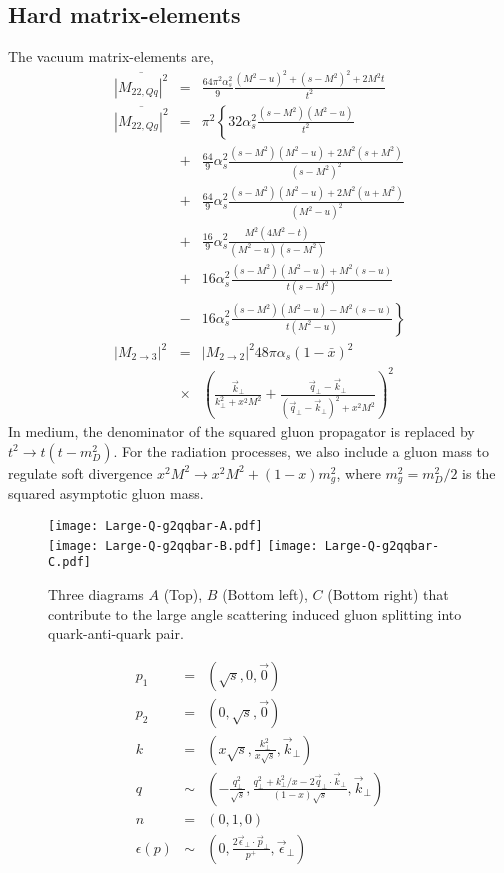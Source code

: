 \subsection{Hard matrix-elements}

The vacuum matrix-elements are,
\begin{eqnarray}
\overline{|M_{22,Qq}|^2} &=& \frac{64\pi^2\alpha_s^2}{9} \frac{(M^2-u)^2 + (s-M^2)^2 + 2 M^2 t}{t^2}
\nonumber
\\
\overline{|M_{22,Qg}|^2} &=& \pi^2 \left\{
32\alpha_s^2 \frac{(s-M^2)(M^2-u)}{t^2} \right.
\nonumber
\\
&+&\frac{64}{9}\alpha_s^2 \frac{(s-M^2)(M^2-u)+2M^2(s+M^2)}{(s-M^2)^2} \nonumber
\\
&+&\frac{64}{9}\alpha_s^2 \frac{(s-M^2)(M^2-u)+2M^2(u+M^2)}{(M^2-u)^2} \nonumber
\\
&+& \frac{16}{9}\alpha_s^2 \frac{M^2(4M^2 - t)}{(M^2-u)(s-M^2)} 
\nonumber
\\
&+& 16 \alpha_s^2 \frac{(s-M^2)(M^2-u)+M^2(s-u)}{t(s-M^2)}
\nonumber
\\
&-& \left. 16 \alpha_s^2 \frac{(s-M^2)(M^2-u)-M^2(s-u)}{t(M^2-u)}\right\}
\nonumber
\\
|M_{2\rightarrow 3}|^2 &=& |M_{2\rightarrow 2}|^2 48 \pi \alpha_s (1-\bar{x})^2
\nonumber
\\
&\times&\left(\frac{\vec{k}_\perp}{k_\perp^2 + x^2 M^2} + \frac{\vec{q}_\perp - \vec{k}_\perp}{(\vec{q}_\perp-\vec{k}_\perp)^2 + x^2 M^2}
\right)^2 
\end{eqnarray}
In medium, the denominator of the squared gluon propagator is replaced by $t^2 \rightarrow t(t-m_D^2)$. 
For the radiation processes, we also include a gluon mass to regulate soft divergence $x^2M^2 \rightarrow x^2M^2 + (1-x)m_g^2$, where $m_g^2 = m_D^2/2$ is the squared asymptotic gluon mass. 

\begin{figure}
\centering
\texttt{[image: Large-Q-g2qqbar-A.pdf]}\\
\vspace{1em}
\texttt{[image: Large-Q-g2qqbar-B.pdf]}\hfill
\texttt{[image: Large-Q-g2qqbar-C.pdf]}
\caption{Three diagrams $A$ (Top), $B$ (Bottom left), $C$ (Bottom right) that contribute to the large angle scattering induced gluon splitting into quark-anti-quark pair.}
\end{figure}


\begin{eqnarray}
p_1 &=& (\sqrt{s}, 0, \vec{0})\\
p_2 &=& (0, \sqrt{s}, \vec{0})\\
k &=& (x\sqrt{s}, \frac{k_\perp^2}{x\sqrt{s}}, \vec{k}_\perp)\\
q &\sim& (-\frac{q_\perp^2}{\sqrt{s}}, \frac{q_\perp^2 + k_\perp^2/x - 2\vec{q}_\perp \cdot \vec{k}_\perp}{(1-x)\sqrt{s}}, \vec{k}_\perp)\\
n &=& (0, 1, 0)\\
\epsilon(p) &\sim& (0, \frac{2\vec{\epsilon}_\perp\cdot\vec{p}_\perp}{p^+}, \vec{\epsilon}_\perp)
\end{eqnarray}

